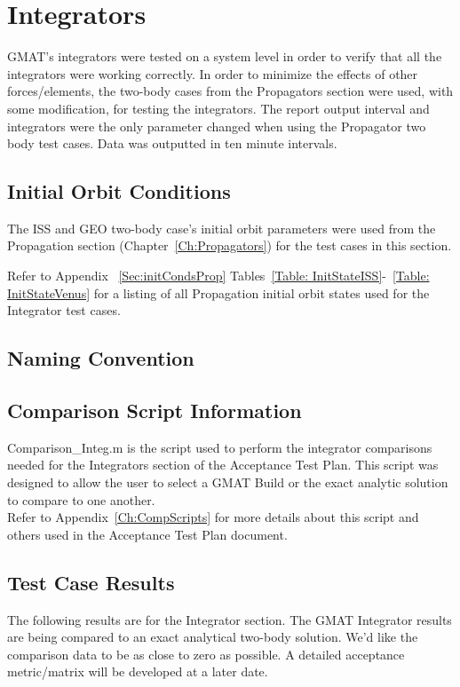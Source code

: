 \chapter{Integrators} \label{Ch:Integrators}
GMAT's integrators were tested on a system level in order to verify
that all the integrators were working correctly. In order to
minimize the effects of other forces/elements, the two-body cases
from the Propagators section were used, with some modification, for
testing the integrators. The report output interval and integrators
were the only parameter changed when using the Propagator two body
test cases. Data was outputted in ten minute intervals.

\section{Initial Orbit Conditions}
The ISS and GEO two-body case's initial orbit
parameters were used from the Propagation section
(Chapter~\ref{Ch:Propagators}) for the test cases in this section.

Refer to Appendix ~\ref{Sec:initCondsProp} Tables~\ref{Table:
InitStateISS}-~\ref{Table: InitStateVenus} for a listing of all
Propagation initial orbit states used for the
Integrator test cases.

\section{Naming Convention}
\label{nameConvInteg}


\section{Comparison Script Information}
Comparison\_Integ.m is the script used to perform the integrator
comparisons needed for the Integrators section of the Acceptance
Test Plan. This script was designed to allow the user to select a
GMAT Build or the exact analytic solution to compare to one
another.\\

Refer to Appendix~\ref{Ch:CompScripts} for more details about this
script and others used in the Acceptance Test Plan document.
\clearpage

\section{Test Case Results}
The following results are for the Integrator section. The GMAT
Integrator results are being compared to an exact analytical
two-body solution. We'd like the comparison data to be as close to
zero as possible. A detailed acceptance metric/matrix will be
developed at a later date.

